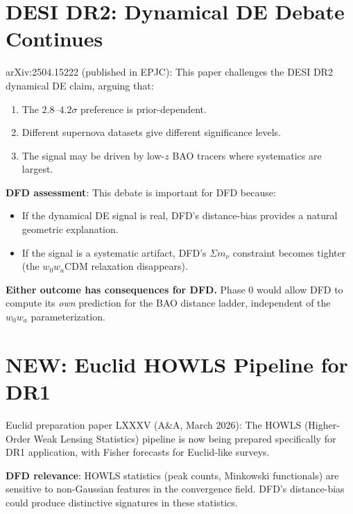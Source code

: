 \documentclass[11pt,a4paper]{article}
\newcommand{\NEW}{\textcolor{dfdblue}{\textbf{NEW}}}
\begin{document}
\section{DESI DR2: Dynamical DE Debate Continues}

\begin{tcolorbox}[colback=blue!5!white, colframe=blue!60!black,
  title={\NEW: Giar\`e et al.\ (EPJC, 2025): ``Did DESI DR2 truly reveal dynamical dark energy?''}]

arXiv:2504.15222 (published in EPJC): This paper challenges the DESI DR2 dynamical DE claim, arguing that:
\begin{enumerate}
\item The $2.8$--$4.2\sigma$ preference is prior-dependent.
\item Different supernova datasets give different significance levels.
\item The signal may be driven by low-$z$ BAO tracers where systematics are largest.
\end{enumerate}

\textbf{DFD assessment}: This debate is important for DFD because:
\begin{itemize}
\item If the dynamical DE signal is real, DFD's distance-bias provides a natural geometric explanation.
\item If the signal is a systematic artifact, DFD's $\Sigma m_\nu$ constraint becomes tighter (the $w_0 w_a$CDM relaxation disappears).
\end{itemize}

\textbf{Either outcome has consequences for DFD.} Phase 0 would allow DFD to compute its \emph{own} prediction for the BAO distance ladder, independent of the $w_0 w_a$ parameterization.
\end{tcolorbox}

\section{\NEW: Euclid HOWLS Pipeline for DR1}

Euclid preparation paper LXXXV (A\&A, March 2026): The HOWLS (Higher-Order Weak Lensing Statistics) pipeline is now being prepared specifically for DR1 application, with Fisher forecasts for Euclid-like surveys.

\textbf{DFD relevance}: HOWLS statistics (peak counts, Minkowski functionals) are sensitive to non-Gaussian features in the convergence field. DFD's distance-bias could produce distinctive signatures in these statistics.
\end{document}

